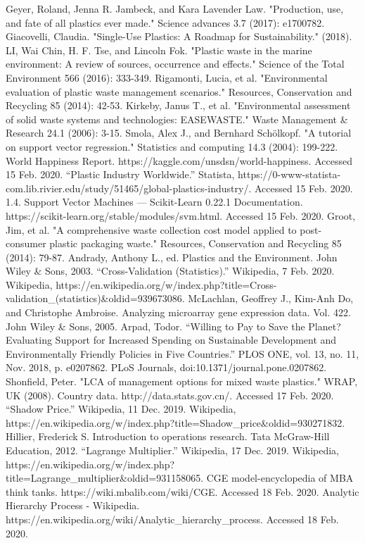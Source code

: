\documentclass{mcmthesis}
\begin{document}
\begin{thebibliography}{99}
 Geyer, Roland, Jenna R. Jambeck, and Kara Lavender Law. "Production, use, and fate of all plastics ever made." Science advances 3.7 (2017): e1700782.
 Giacovelli, Claudia. "Single-Use Plastics: A Roadmap for Sustainability." (2018).
LI, Wai Chin, H. F. Tse, and Lincoln Fok. "Plastic waste in the marine environment: A review of sources, occurrence and effects." Science of the Total Environment 566 (2016): 333-349.
Rigamonti, Lucia, et al. "Environmental evaluation of plastic waste management scenarios." Resources, Conservation and Recycling 85 (2014): 42-53.
Kirkeby, Janus T., et al. "Environmental assessment of solid waste systems and technologies: EASEWASTE." Waste Management \& Research 24.1 (2006): 3-15.
Smola, Alex J., and Bernhard Schölkopf. "A tutorial on support vector regression." Statistics and computing 14.3 (2004): 199-222.
World Happiness Report. https://kaggle.com/unsdsn/world-happiness. Accessed 15 Feb. 2020.
“Plastic Industry Worldwide.” Statista, https://0-www-statista-com.lib.rivier.edu/study/51465/global-plastics-industry/. Accessed 15 Feb. 2020.
1.4. Support Vector Machines — Scikit-Learn 0.22.1 Documentation. https://scikit-learn.org/stable/modules/svm.html. Accessed 15 Feb. 2020.
Groot, Jim, et al. "A comprehensive waste collection cost model applied to post-consumer plastic packaging waste." Resources, Conservation and Recycling 85 (2014): 79-87.
Andrady, Anthony L., ed. Plastics and the Environment. John Wiley \& Sons, 2003.
“Cross-Validation (Statistics).” Wikipedia, 7 Feb. 2020. Wikipedia, https://en.wikipedia.org/w/index.php?title=Cross-validation\_(statistics)\&oldid=939673086.
McLachlan, Geoffrey J., Kim-Anh Do, and Christophe Ambroise. Analyzing microarray gene expression data. Vol. 422. John Wiley \& Sons, 2005.
Arpad, Todor. “Willing to Pay to Save the Planet? Evaluating Support for Increased Spending on Sustainable Development and Environmentally Friendly Policies in Five Countries.” PLOS ONE, vol. 13, no. 11, Nov. 2018, p. e0207862. PLoS Journals, doi:10.1371/journal.pone.0207862.
Shonfield, Peter. "LCA of management options for mixed waste plastics." WRAP, UK (2008).
Country data. http://data.stats.gov.cn/. Accessed 17 Feb. 2020.
“Shadow Price.” Wikipedia, 11 Dec. 2019. Wikipedia, https://en.wikipedia.org/w/index.php?title=Shadow\_price\&oldid=930271832.
Hillier, Frederick S. Introduction to operations research. Tata McGraw-Hill Education, 2012.
“Lagrange Multiplier.” Wikipedia, 17 Dec. 2019. Wikipedia, https://en.wikipedia.org/w/index.php?title=Lagrange\_multiplier\&oldid=931158065.
CGE model-encyclopedia of MBA think tanks. https://wiki.mbalib.com/wiki/CGE. Accessed 18 Feb. 2020.
Analytic Hierarchy Process - Wikipedia. https://en.wikipedia.org/wiki/Analytic\_hierarchy\_process. Accessed 18 Feb. 2020.


\end{thebibliography}
\end{document}

